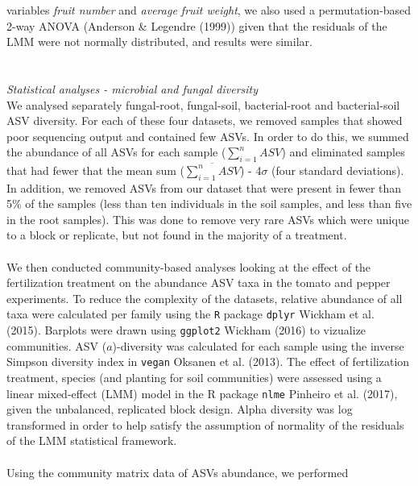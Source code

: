\documentclass[11pt,]{article}
\begin{document}
variables \emph{fruit number} and \emph{average fruit weight}, we also
used a permutation-based 2-way ANOVA (Anderson \& Legendre (1999)) given
that the residuals of the LMM were not normally distributed, and results
were similar.\\
\hspace*{0.333em}\\
\hspace*{0.333em}\\
\emph{Statistical analyses - microbial and fungal diversity}\\
We analysed separately fungal-root, fungal-soil, bacterial-root and
bacterial-soil ASV diversity. For each of these four datasets, we
removed samples that showed poor sequencing output and contained few
ASVs. In order to do this, we summed the abundance of all ASVs for each
sample (\(\sum_{i=1}^n ASV\)) and eliminated samples that had fewer that
the mean sum (\(\overline{\sum_{i=1}^n ASV}\)) - 4\(\sigma\) (four
standard deviations). In addition, we removed ASVs from our dataset that
were present in fewer than 5\% of the samples (less than ten individuals
in the soil samples, and less than five in the root samples). This was
done to remove very rare ASVs which were unique to a block or replicate,
but not found in the majority of a treatment.\\
\hspace*{0.333em}\\
We then conducted community-based analyses looking at the effect of the
fertilization treatment on the abundance ASV taxa in the tomato and
pepper experiments. To reduce the complexity of the datasets, relative
abundance of all taxa were calculated per family using the \texttt{R}
package \texttt{dplyr} Wickham et al. (2015). Barplots were drawn using
\texttt{ggplot2} Wickham (2016) to vizualize communities. ASV
(\(a\))-diversity was calculated for each sample using the inverse
Simpson diversity index in \texttt{vegan} Oksanen et al. (2013). The
effect of fertilization treatment, species (and planting for soil
communities) were assessed using a linear mixed-effect (LMM) model in
the R package \texttt{nlme} Pinheiro et al. (2017), given the
unbalanced, replicated block design. Alpha diversity was log transformed
in order to help satisfy the assumption of normality of the residuals of
the LMM statistical framework.\\
\hspace*{0.333em}\\
Using the community matrix data of ASVs abundance, we performed
\end{document}
